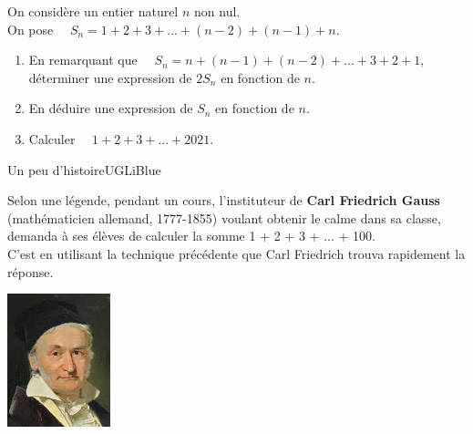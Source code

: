 \documentclass[a4paper,12pt,french]{article}
\begin{document}
\exo{}
On considère un entier naturel $n$ non nul.\\
On pose $\quad S_n=1+2+3+...+(n-2)+(n-1)+n$.
\begin{enumerate}[\bfseries 1.]
	\item 	En remarquant que $\quad S_n=n+(n-1)+(n-2)+...+3+2+1,\quad$ déterminer une expression de $2S_n$ en fonction de $n$.
	\item 	En déduire une expression de $S_n$ en fonction de $n$.
	\item	Calculer $\quad 1+2+3+...+2021$.
\end{enumerate}
\begin{encadrecolore}{Un peu d'histoire}{UGLiBlue}
\begin{minipage}{12cm}
	Selon une légende, pendant un cours, l'instituteur de \textbf{Carl Friedrich Gauss} (mathématicien allemand, 1777-1855) voulant obtenir le calme dans sa classe, demanda à ses élèves de calculer la somme 1 + 2 + 3 + ... + 100.\\
	C'est en utilisant la technique précédente que Carl Friedrich trouva rapidement la réponse.
\end{minipage}
\begin{minipage}{4cm}
	\flushright
	\includegraphics[width=3cm]{Gauss}\\
\end{minipage}
	




\end{encadrecolore}
\end{document}
